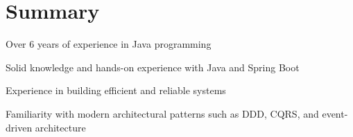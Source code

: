 \documentclass[]{plushcv}
\begin{document}
\begin{minipage}[t]{0.70\textwidth} 



\section{Summary}

\begin{tightemize}
\item Over 6 years of experience in Java programming
\item Solid knowledge and hands-on experience with Java and Spring Boot
\item Experience in building efficient and reliable systems
\item Familiarity with modern architectural patterns such as DDD, CQRS, and event-driven architecture
\end{tightemize}
\sectionsep




\end{minipage}
\end{document}
